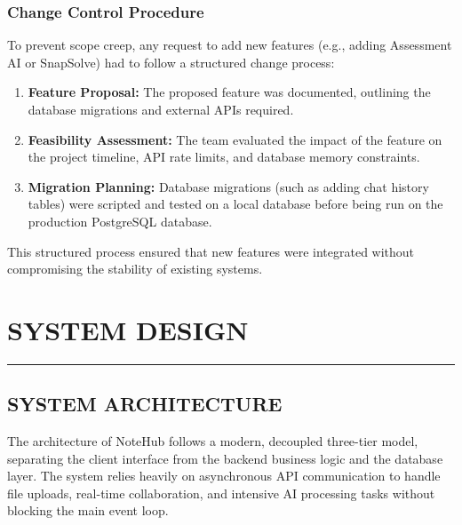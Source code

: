 \documentclass[12,Times new Roman,a4paper]{report}
\begin{document}
\subsection{Change Control Procedure}
To prevent scope creep, any request to add new features (e.g., adding Assessment AI or SnapSolve) had to follow a structured change process:
\begin{enumerate}
    \item \textbf{Feature Proposal:} The proposed feature was documented, outlining the database migrations and external APIs required.
    \item \textbf{Feasibility Assessment:} The team evaluated the impact of the feature on the project timeline, API rate limits, and database memory constraints.
    \item \textbf{Migration Planning:} Database migrations (such as adding chat history tables) were scripted and tested on a local database before being run on the production PostgreSQL database.
\end{enumerate}
This structured process ensured that new features were integrated without compromising the stability of existing systems.
\chapter{SYSTEM DESIGN}
\rule{\textwidth}{1pt}

\section{SYSTEM ARCHITECTURE}
The architecture of NoteHub follows a modern, decoupled three-tier model, separating the client interface from the backend business logic and the database layer. The system relies heavily on asynchronous API communication to handle file uploads, real-time collaboration, and intensive AI processing tasks without blocking the main event loop.
\end{document}
